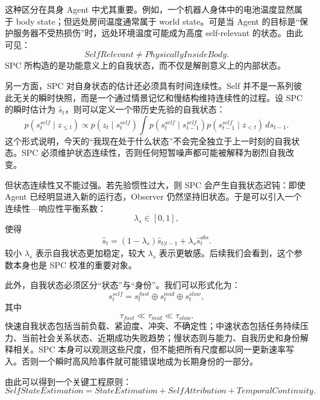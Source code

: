 这种区分在具身 Agent 中尤其重要。例如，一个机器人身体中的电池温度显然属于 body state；但远处房间温度通常属于 world state。可是当 Agent 的目标是“保护服务器不受热损伤”时，远处环境温度可能成为高度 self-relevant 的状态。由此可见：
\begin{equation}
SelfRelevant
\neq
PhysicallyInsideBody.
\end{equation}
SPC 所构造的是功能意义上的自我状态，而不仅是解剖意义上的内部状态。

另一方面，SPC 对自身状态的估计还必须具有时间连续性。Self 并不是一系列彼此无关的瞬时快照，而是一个通过情景记忆和慢结构维持连续性的过程。设 SPC 的瞬时估计为 $\hat s_t$，则可以定义一个带历史先验的自我状态：
\begin{equation}
p(s_t^{self}\mid z_{\leq t})
\propto
p(z_t\mid s_t^{self})
\int
p(s_t^{self}\mid s_{t-1}^{self})
p(s_{t-1}^{self}\mid z_{<t})
\,ds_{t-1}.
\end{equation}
这个形式说明，今天的“我现在处于什么状态”不会完全独立于上一时刻的自我状态。SPC 必须维护状态连续性，否则任何短暂噪声都可能被解释为剧烈自我改变。

但状态连续性又不能过强。若先验惯性过大，则 SPC 会产生自我状态迟钝：即使 Agent 已经明显进入新的运行态，Observer 仍然坚持旧状态。于是可以引入一个连续性—响应性平衡系数：
\begin{equation}
\lambda_s
\in[0,1],
\end{equation}
使得
\begin{equation}
\hat s_t
=
(1-\lambda_s)
\hat s_{t|t-1}
+
\lambda_s
\hat s_t^{obs}.
\end{equation}
较小 $\lambda_s$ 表示自我状态更加稳定，较大 $\lambda_s$ 表示更敏感。后续我们会看到，这个参数本身也是 SPC 校准的重要对象。

此外，自我状态必须区分“状态”与“身份”。我们可以形式化为：
\begin{equation}
s_t^{self}
=
s_t^{fast}
\oplus
s_t^{mid}
\oplus
s_t^{slow},
\end{equation}
其中
\begin{equation}
\tau_{fast}
\ll
\tau_{mid}
\ll
\tau_{slow}.
\end{equation}
快速自我状态包括当前负载、紧迫度、冲突、不确定性；中速状态包括任务持续压力、当前社会关系状态、近期成功失败趋势；慢状态则与能力、自我历史和身份解释相关。SPC 本身可以观测这些尺度，但不能把所有尺度都以同一更新速率写入。否则一个瞬时高风险事件就可能错误地成为长期身份的一部分。

由此可以得到一个关键工程原则：
\begin{equation}
\boxed{
SelfStateEstimation
=
StateEstimation
+
SelfAttribution
+
TemporalContinuity.
}
\end{equation}

